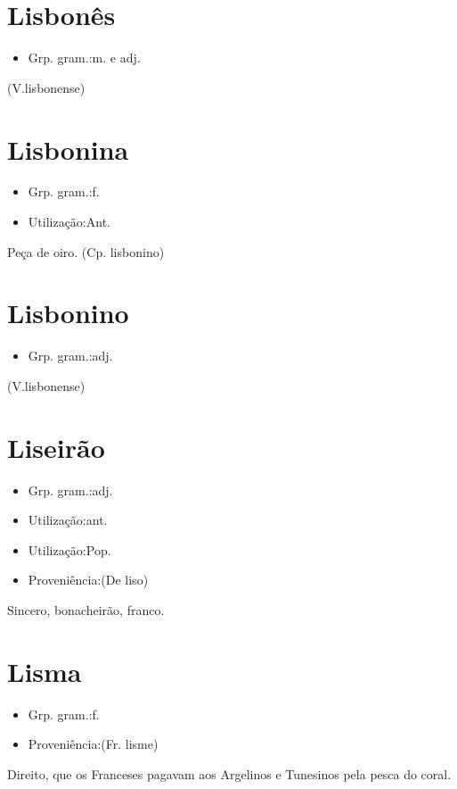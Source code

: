 \section{Lisbonês}
\begin{itemize}
\item {Grp. gram.:m.  e  adj.}
\end{itemize}
(V.lisbonense)
\section{Lisbonina}
\begin{itemize}
\item {Grp. gram.:f.}
\end{itemize}
\begin{itemize}
\item {Utilização:Ant.}
\end{itemize}
Peça de oiro.
(Cp. \textunderscore lisbonino\textunderscore )
\section{Lisbonino}
\begin{itemize}
\item {Grp. gram.:adj.}
\end{itemize}
(V.lisbonense)
\section{Liseirão}
\begin{itemize}
\item {Grp. gram.:adj.}
\end{itemize}
\begin{itemize}
\item {Utilização:ant.}
\end{itemize}
\begin{itemize}
\item {Utilização:Pop.}
\end{itemize}
\begin{itemize}
\item {Proveniência:(De \textunderscore liso\textunderscore )}
\end{itemize}
Sincero, bonacheirão, franco.
\section{Lisma}
\begin{itemize}
\item {Grp. gram.:f.}
\end{itemize}
\begin{itemize}
\item {Proveniência:(Fr. \textunderscore lisme\textunderscore )}
\end{itemize}
Direito, que os Franceses pagavam aos Argelinos e Tunesinos pela pesca do coral.
